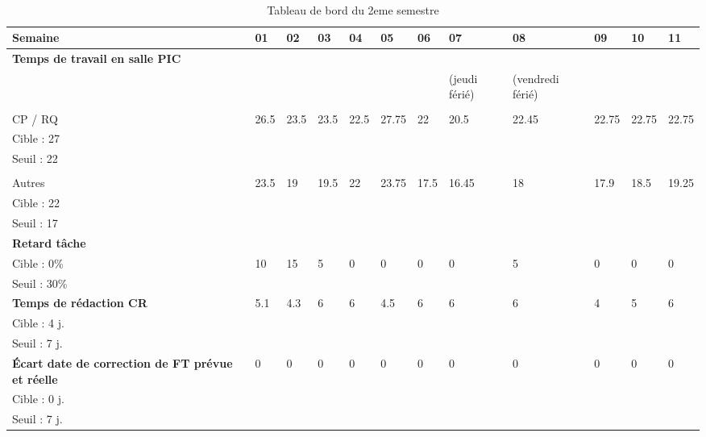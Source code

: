 \documentclass[asi,sansVersion]{picInsa}
\begin{document}
	\newpage
	\begin{landscape}
	\begin{center}
		\LARGE
		\textsc{
			\TB{}\\
		}
	\end{center}
	\vspace{0.5cm}


		\begin{longtable}{|p{2.2cm}|p{1cm}|p{1cm}|p{1cm}|p{1cm}|p{1cm}|p{1cm}|p{1cm}|p{1cm}|p{1cm}|p{1cm}|p{1cm}|}
		\caption{Tableau de bord du 2eme semestre}\\\hline
			\hline
			\rowcolor[gray]{0.85}
			Semaine & 01 & 02 & 03 & 04 & 05 & 06 & 07 & 08 & 09 & 10 & 11 \\\hline
			\footnotesize
			\textbf{Temps de travail en salle PIC} & & & & & & & & & & &\\ 
			& & & & & & & (jeudi férié)& (vendredi férié) & & &\\
			& & & & & & & & & & &\\
			CP / RQ & 26.5 & 23.5 & 23.5 & 22.5 & 27.75 & 22 & 20.5 & 22.45 & 22.75 & 22.75 & 22.75\\
			Cible : 27 & & & & & & & & & & &\\
			Seuil : 22 & & & & & & & & & & &\\
			& & & & & & & & & & &\\
			Autres  & 23.5 & 19 & 19.5 & 22 & 23.75 & 17.5 & 16.45 & 18 & 17.9 & 18.5 & 19.25\\
			Cible : 22  & & & & & & & & & & &\\
			Seuil : 17 & & & & & & & & & & &\\\hline
			\footnotesize
			\textbf{Retard tâche} & & & & & & & & & & &\\
			Cible : 0\% & 10 & 15 & 5 & 0 & 0 & 0 & 0 & 5 & 0 & 0 & 0\\
			Seuil : 30\% & & & & & & & & & & &\\\hline
			\textbf{Temps de rédaction CR} & 5.1 & 4.3 & 6 & 6 & 4.5 & 6 & 6 & 6 & 4 & 5 & 6\\
			Cible : 4 j. & & & & & & & & & & &\\
			Seuil : 7 j. & & & & & & & & & & &\\\hline
			\footnotesize
			\textbf{Écart date de correction de FT prévue et réelle} & 0 & 0 & 0 & 0 & 0 & 0 & 0 & 0 & 0 & 0 & 0\\
			Cible : 0 j. & & & & & & & & & & &\\
			Seuil : 7 j. & & & & & & & & & & &\\\hline
			
		\end{longtable}
	\end{landscape}
\end{document}
